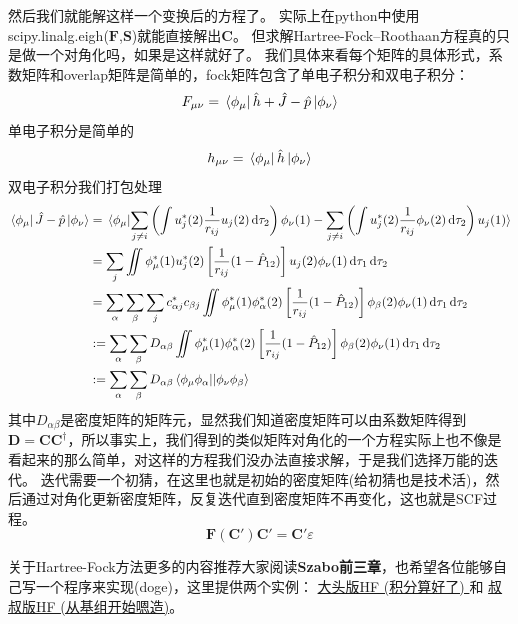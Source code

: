 然后我们就能解这样一个变换后的方程了。
实际上在python中使用scipy.linalg.eigh($\mathbf{F}$,$\mathbf{S}$)就能直接解出$\mathbf{C}$。
但求解Hartree-Fock–Roothaan方程真的只是做一个对角化吗，如果是这样就好了。
我们具体来看每个矩阵的具体形式，系数矩阵和overlap矩阵是简单的，fock矩阵包含了单电子积分和双电子积分：
\[F_{\mu\nu} = \bra*{\phi_{\mu}}\hat{h} + \hat{J} - \hat{p}\ket*{\phi_{\nu}}\]
单电子积分是简单的
\[h_{\mu\nu}=\bra*{\phi_{\mu}}\hat{h}\ket*{\phi_{\nu}}\]
双电子积分我们打包处理
\begin{equation*}
    \begin{aligned}
        \bra*{\phi_{\mu}}\hat{J} - \hat{p}\ket*{\phi_{\nu}} & = \bra*{\phi_{\mu}}\ket{\sum_{j \neq i}\left(\int u_j^*(2)\frac{1}{r_{ij}}u_j(2)\dd{\tau_2}\right)\phi_{\nu}(1)-\sum_{j \neq i}\left(\int u_j^*(2)\frac{1}{r_{ij}}\phi_{\nu}(2)\dd{\tau_2}\right)u_j(1)} \\
         & = \sum_{j}\iint \phi_{\mu}^*(1)u_j^*(2)\left[\frac{1}{r_{ij}}(1-\hat{P}_{12})\right]u_j(2)\phi_{\nu}(1) \dd{\tau_1}\dd{\tau_2} \\
         & = \sum_{\alpha}\sum_{\beta}\sum_{j}c^*_{\alpha j}c_{\beta j}\iint \phi_{\mu}^*(1)\phi_{\alpha}^*(2)\left[\frac{1}{r_{ij}}(1-\hat{P}_{12})\right]\phi_{\beta}(2)\phi_{\nu}(1) \dd{\tau_1}\dd{\tau_2} \\
         & := \sum_{\alpha}\sum_{\beta}D_{\alpha\beta}\iint \phi_{\mu}^*(1)\phi_{\alpha}^*(2)\left[\frac{1}{r_{ij}}(1-\hat{P}_{12})\right]\phi_{\beta}(2)\phi_{\nu}(1) \dd{\tau_1}\dd{\tau_2} \\
         & := \sum_{\alpha}\sum_{\beta}D_{\alpha\beta}\bra{\phi_{\mu}\phi_{\alpha}}\ket{|\phi_{\nu}\phi_{\beta}}
    \end{aligned}
\end{equation*}
其中$D_{\alpha\beta}$是密度矩阵的矩阵元，显然我们知道密度矩阵可以由系数矩阵得到$\mathbf{D}=\mathbf{C}\mathbf{C}^{\dagger}$，所以事实上，我们得到的类似矩阵对角化的一个方程实际上也不像是看起来的那么简单，对这样的方程我们没办法直接求解，于是我们选择万能的迭代。
迭代需要一个初猜，在这里也就是初始的密度矩阵(给初猜也是技术活)，然后通过对角化更新密度矩阵，反复迭代直到密度矩阵不再变化，这也就是SCF过程。
\[\mathbf{F}(\mathbf{C}')\mathbf{C}'=\mathbf{C}'\varepsilon\]

关于Hartree-Fock方法更多的内容推荐大家阅读\textbf{Szabo前三章}，也希望各位能够自己写一个程序来实现(doge)，这里提供两个实例：
\href{https://github.com/yangdatou/hf-tutorial}{大头版HF (积分算好了) }和
\href{https://github.com/Walter-Feng/Hartree-Fock-in-CPP}{叔叔版HF (从基组开始嗯造)}。

